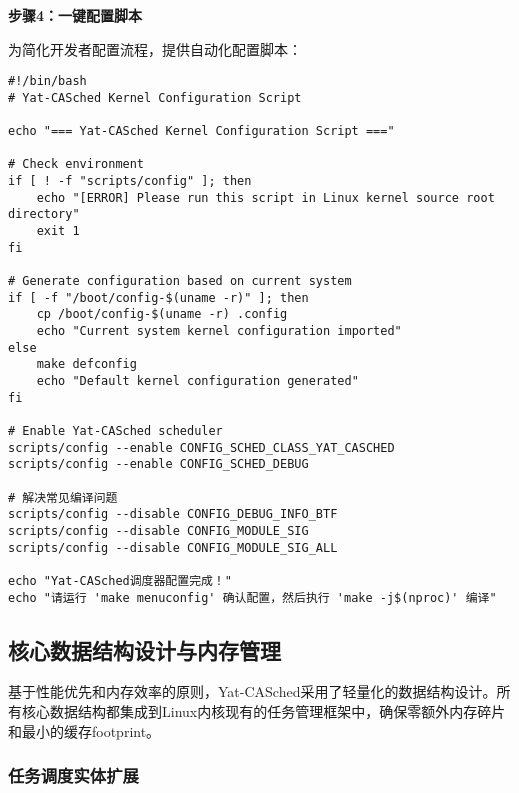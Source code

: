 \textbf{步骤4：一键配置脚本}

为简化开发者配置流程，提供自动化配置脚本：

\begin{tcolorbox} [
    enhanced,
    colback=purple!5,
    colframe=purple!40!black,
    leftrule=3mm,
    rightrule=0mm,
    toprule=0mm,
    bottomrule=0mm,
    arc=2mm,
    left=5mm,
    right=5mm,
    top=3mm,
    bottom=3mm,
    fonttitle=\bfseries,
    title=\textbf{自动化配置脚本}
]
\begin{lstlisting}[basicstyle=\footnotesize\fontfamily{zi4}\selectfont, showstringspaces=false]
#!/bin/bash
# Yat-CASched Kernel Configuration Script

echo "=== Yat-CASched Kernel Configuration Script ==="

# Check environment
if [ ! -f "scripts/config" ]; then
    echo "[ERROR] Please run this script in Linux kernel source root directory"
    exit 1
fi

# Generate configuration based on current system
if [ -f "/boot/config-$(uname -r)" ]; then
    cp /boot/config-$(uname -r) .config
    echo "Current system kernel configuration imported"
else
    make defconfig
    echo "Default kernel configuration generated"
fi

# Enable Yat-CASched scheduler
scripts/config --enable CONFIG_SCHED_CLASS_YAT_CASCHED
scripts/config --enable CONFIG_SCHED_DEBUG

# 解决常见编译问题
scripts/config --disable CONFIG_DEBUG_INFO_BTF
scripts/config --disable CONFIG_MODULE_SIG
scripts/config --disable CONFIG_MODULE_SIG_ALL

echo "Yat-CASched调度器配置完成！"
echo "请运行 'make menuconfig' 确认配置，然后执行 'make -j$(nproc)' 编译"
\end{lstlisting}
\end{tcolorbox}

\subsection{核心数据结构设计与内存管理}

基于性能优先和内存效率的原则，Yat-CASched采用了轻量化的数据结构设计。所有核心数据结构都集成到Linux内核现有的任务管理框架中，确保零额外内存碎片和最小的缓存footprint。

\subsubsection{任务调度实体扩展}

